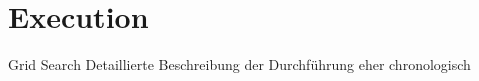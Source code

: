 \section{Execution}
\label{chp:study:sec:execution}
Grid Search
Detaillierte Beschreibung der Durchführung
eher chronologisch
